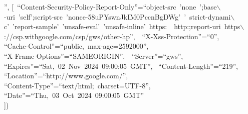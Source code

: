\documentclass{article}
\begin{document}
\begin{maplegroup}
\begin{maplelatex}
{{{''}, [\mbox{
``Content-Security-Policy-Report-Only''}=\mbox{``object-src~'none
';base$\backslash$} \\
\mbox{-uri~'self';script-src~'nonce-58uPYswnJkIM0PccnBgDWg'~'
strict-dynami$\backslash$} \\
\mbox{c'~'report-sample'~'unsafe-eval'~'unsafe-inline'~https:~
http:;report-uri~https$\backslash$} \\
\mbox{://csp.withgoogle.com/csp/gws/other-hp''}, \,\mbox{
``X-Xss-Protection''}=\mbox{``0''},  \\
\mbox{``Cache-Control''}=\mbox{``public,~max-age=2592000''},  \\
\mbox{``X-Frame-Options''}=\mbox{``SAMEORIGIN''}, \,\mbox{
``Server''}=\mbox{``gws''},  \\
\mbox{``Expires''}=\mbox{``Sat,~02~Nov~2024~09:00:05~GMT''}, \,
\mbox{``Content-Length''}=\mbox{``219''},  \\
\mbox{``Location''}=\mbox{``http://www.google.com/''},  \\
\mbox{``Content-Type''}=\mbox{``text/html;~charset=UTF-8''},  \\
\mbox{``Date''}=\mbox{``Thu,~03~Oct~2024~09:00:05~GMT''} \\
]) }
%
}
\end{maplelatex}

\end{maplegroup}
\end{document}
